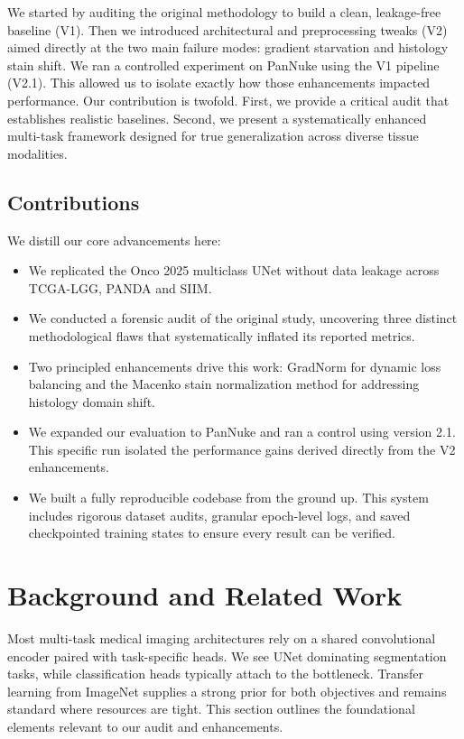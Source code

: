 \documentclass[conference,a4paper]{IEEEtran}
\begin{document}
We started by auditing the original methodology to build a clean, leakage-free baseline (V1). Then we introduced architectural and preprocessing tweaks (V2) aimed directly at the two main failure modes: gradient starvation and histology stain shift. We ran a controlled experiment on PanNuke using the V1 pipeline (V2.1). This allowed us to isolate exactly how those enhancements impacted performance. Our contribution is twofold. First, we provide a critical audit that establishes realistic baselines. Second, we present a systematically enhanced multi-task framework designed for true generalization across diverse tissue modalities.

\subsection{Contributions}
We distill our core advancements here:
\begin{itemize}
\item We replicated the Onco 2025 multiclass UNet without data leakage across TCGA-LGG, PANDA and SIIM.
\item We conducted a forensic audit of the original study, uncovering three distinct methodological flaws that systematically inflated its reported metrics.
\item Two principled enhancements drive this work: GradNorm for dynamic loss balancing and the Macenko stain normalization method for addressing histology domain shift.
\item We expanded our evaluation to PanNuke and ran a control using version 2.1. This specific run isolated the performance gains derived directly from the V2 enhancements.
\item We built a fully reproducible codebase from the ground up. This system includes rigorous dataset audits, granular epoch-level logs, and saved checkpointed training states to ensure every result can be verified.
\end{itemize}
\section{Background and Related Work}
Most multi-task medical imaging architectures rely on a shared convolutional encoder paired with task-specific heads. We see UNet dominating segmentation tasks, while classification heads typically attach to the bottleneck. Transfer learning from ImageNet supplies a strong prior for both objectives and remains standard where resources are tight. This section outlines the foundational elements relevant to our audit and enhancements.
\end{document}
